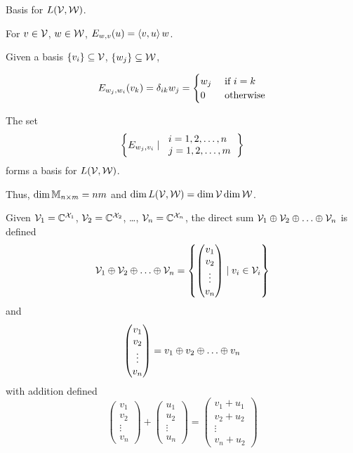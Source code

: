 Basis for $L(\mathcal{V}, \mathcal{W})$.

For $v \in \mathcal{V}$, $w\in\mathcal{W}$, $E_{w,v}(u) = \left\langle v, u\right\rangle w$.

Given a basis $\left\lbrace v_i\right\rbrace\subseteq\mathcal{V}$, $\left\lbrace w_j\right\rbrace\subseteq\mathcal{W}$,

\[E_{w_j,w_i}(v_k) = \delta_{ik}w_j = \begin{cases}w_j & \hbox{ if $i = k$}\\0 &\hbox{ otherwise}\end{cases}\]

The set
\[\set{E_{w_j,v_i} \suchthat \begin{tabular}{l}$i=1,2,\dots,n$\\$j=1,2,\dots,m$\end{tabular}}\]
forms a basis for $L(\mathcal{V}, \mathcal{W})$.

Thus, $\dim \mathbb{M}_{n\times m} = nm$ and $\dim L(\mathcal{V}, \mathcal{W}) = \dim \mathcal{V} \dim \mathcal{W}$.

\begin{definition}
    Given $\mathcal{V}_1 = \mathbb{C}^{\mathcal{X}_1}$, $\mathcal{V}_2 = \mathbb{C}^{\mathcal{X}_2}$,
    \dots, $\mathcal{V}_n = \mathbb{C}^{\mathcal{X}_n}$, the direct sum
    $\vecspace{V}_1 \directsum \vecspace{V}_2 \directsum \dots \directsum \vecspace{V}_n$ is defined
    \[\vecspace{V}_1 \directsum \vecspace{V}_2 \directsum \dots \directsum \vecspace{V}_n = \set{\begin{pmatrix}v_1\\v_2\\\vdots\\v_n\end{pmatrix}\suchthat v_i \in \vecspace{V}_i}\]
    and
    \[\begin{pmatrix}v_1\\v_2\\\vdots\\v_n\end{pmatrix} = v_1 \directsum v_2 \directsum \dots \directsum v_n\]
    with addition defined
    \[\begin{pmatrix}v_1\\v_2\\\vdots\\v_n\end{pmatrix} + \begin{pmatrix}u_1\\u_2\\\vdots\\u_n\end{pmatrix} = \begin{pmatrix}v_1 + u_1\\v_2 + u_2\\\vdots\\v_n + u_2\end{pmatrix}\]
\end{definition}

